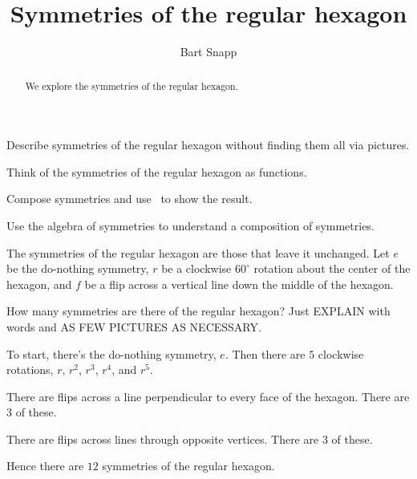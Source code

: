 \documentclass[noauthor,nooutcomes,12pt,hints,handout]{ximera}
\title{Symmetries of the regular hexagon}
\author{Bart Snapp}
\begin{document}
\begin{abstract}
  We explore the symmetries of the regular hexagon.
\end{abstract}
\maketitle

\begin{listOutcomes}
\item Describe symmetries of the regular hexagon without finding them
  all via pictures.
\item Think of the symmetries of the regular hexagon as functions.
\item Compose symmetries and use \snap\ to show the result.
\item Use the algebra of symmetries to understand a composition of
  symmetries.
\end{listOutcomes}
\mynewpage


\begin{question}
  The symmetries of the regular hexagon are those that leave it
  unchanged. Let $e$ be the do-nothing symmetry, $r$ be a clockwise
  $60^\circ$ rotation about the center of the hexagon, and $f$ be a
  flip across a vertical line down the middle of the hexagon.

  
  How many symmetries are there of the regular hexagon? Just
  EXPLAIN with words and AS FEW PICTURES AS NECESSARY.
  \begin{freeResponse}
    To start, there's the do-nothing symmetry, $e$. Then there are
    $5$ clockwise rotations, $r$, $r^2$, $r^3$, $r^4$, and $r^5$.

    There are flips across a line perpendicular to every face of the
    hexagon. There are $3$ of these.

    There are flips across lines through opposite vertices. There are
    $3$ of these.

    Hence there are $12$ symmetries of the regular hexagon.
  \end{freeResponse}
\end{question}
\mynewpage
\end{document}
